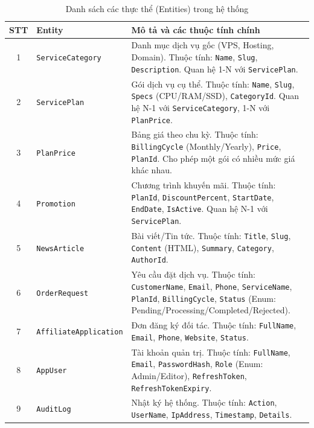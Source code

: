 \begin{table}[htbp]
    \centering
    \caption{Danh sách các thực thể (Entities) trong hệ thống}
    \label{tab:entities}
    \begin{tabular}{|c|p{3.5cm}|p{8.5cm}|}
        \hline
        \textbf{STT} & \textbf{Entity} & \textbf{Mô tả và các thuộc tính chính} \\
        \hline
        1 & \texttt{ServiceCategory} & Danh mục dịch vụ gốc (VPS, Hosting, Domain). Thuộc tính: \texttt{Name}, \texttt{Slug}, \texttt{Description}. Quan hệ 1-N với \texttt{ServicePlan}. \\
        \hline
        2 & \texttt{ServicePlan} & Gói dịch vụ cụ thể. Thuộc tính: \texttt{Name}, \texttt{Slug}, \texttt{Specs} (CPU/RAM/SSD), \texttt{CategoryId}. Quan hệ N-1 với \texttt{ServiceCategory}, 1-N với \texttt{PlanPrice}. \\
        \hline
        3 & \texttt{PlanPrice} & Bảng giá theo chu kỳ. Thuộc tính: \texttt{BillingCycle} (Monthly/Yearly), \texttt{Price}, \texttt{PlanId}. Cho phép một gói có nhiều mức giá khác nhau. \\
        \hline
        4 & \texttt{Promotion} & Chương trình khuyến mãi. Thuộc tính: \texttt{PlanId}, \texttt{DiscountPercent}, \texttt{StartDate}, \texttt{EndDate}, \texttt{IsActive}. Quan hệ N-1 với \texttt{ServicePlan}. \\
        \hline
        5 & \texttt{NewsArticle} & Bài viết/Tin tức. Thuộc tính: \texttt{Title}, \texttt{Slug}, \texttt{Content} (HTML), \texttt{Summary}, \texttt{Category}, \texttt{AuthorId}. \\
        \hline
        6 & \texttt{OrderRequest} & Yêu cầu đặt dịch vụ. Thuộc tính: \texttt{CustomerName}, \texttt{Email}, \texttt{Phone}, \texttt{ServiceName}, \texttt{PlanId}, \texttt{BillingCycle}, \texttt{Status} (Enum: Pending/Processing/Completed/Rejected). \\
        \hline
        7 & \texttt{AffiliateApplication} & Đơn đăng ký đối tác. Thuộc tính: \texttt{FullName}, \texttt{Email}, \texttt{Phone}, \texttt{Website}, \texttt{Status}. \\
        \hline
        8 & \texttt{AppUser} & Tài khoản quản trị. Thuộc tính: \texttt{FullName}, \texttt{Email}, \texttt{PasswordHash}, \texttt{Role} (Enum: Admin/Editor), \texttt{RefreshToken}, \texttt{RefreshTokenExpiry}. \\
        \hline
        9 & \texttt{AuditLog} & Nhật ký hệ thống. Thuộc tính: \texttt{Action}, \texttt{UserName}, \texttt{IpAddress}, \texttt{Timestamp}, \texttt{Details}. \\
        \hline
    \end{tabular}
\end{table}


